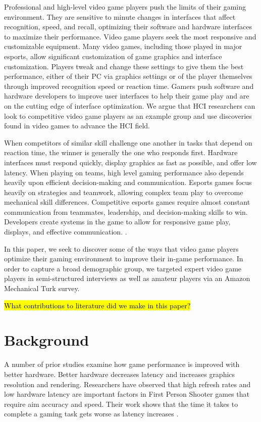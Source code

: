 \documentclass[11pt,manuscript,screen,review]{acmart} %
\begin{document}
Professional and high-level video game players push the limits of their gaming environment. They are sensitive to minute changes in interfaces that affect recognition, speed, and recall, optimizing their software and hardware interfaces to maximize their performance. Video game players seek the most responsive and customizable equipment. Many video games, including those played in major esports, allow significant customization of game graphics and interface customization. Players tweak and change these settings to give them the best performance, either of their PC via graphics settings or of the player themselves through improved recognition speed or reaction time. Gamers push software and hardware developers to improve user interfaces to help their game play and are on the cutting edge of interface optimization. \cite{schell2018} We argue that HCI researchers can look to competitive video game players as an example group and use discoveries found in video games to advance the HCI field.

When competitors of similar skill challenge one another in tasks that depend on reaction time, the winner is generally the one who responds first. Hardware interfaces must respond quickly, display graphics as fast as possible, and offer low latency. When playing on teams, high level gaming performance also depends heavily upon efficient decision-making and communication. Esports games focus heavily on strategies and teamwork, allowing complex team play to overcome mechanical skill differences. Competitive esports games require almost constant communication from teammates, leadership, and decision-making skills to win. Developers create systems in the game to allow for responsive game play, displays, and effective communication. \cite{Alharthi2018}. 

In this paper, we seek to discover some of the ways that video game players optimize their gaming environment to improve their in-game performance. In order to capture a broad demographic group, we targeted expert video game players in semi-structured interviews as well as amateur players via an Amazon Mechanical Turk survey. 

\hl{What contributions to literature did we make in this paper?}

\section{Background} %
A number of prior studies examine how game performance is improved with better hardware. Better hardware decreases latency and increases graphics resolution and rendering. Researchers have observed that high refresh rates \cite{spjut2019} and low hardware latency are important factors in First Person Shooter games that require aim accuracy and speed. Their work shows that the time it takes to complete a gaming task gets worse as latency increases \cite{spjut2021}.
\end{document}
